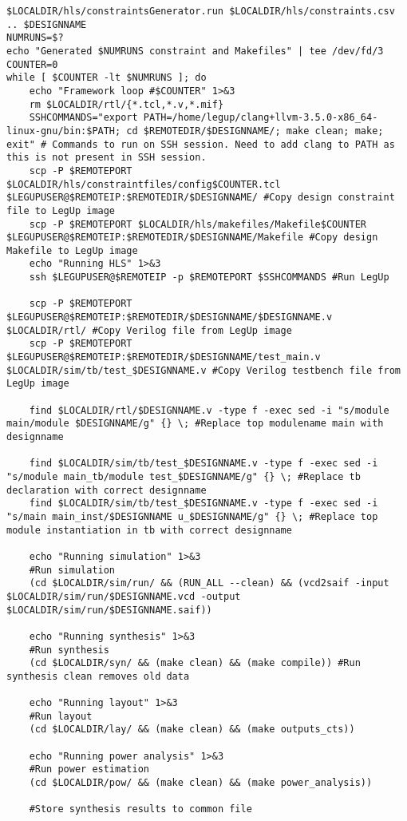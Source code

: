 \begin{lstlisting}[caption={HLS Script source code},label=lst:hlsscriptsourcecode]
$LOCALDIR/hls/constraintsGenerator.run $LOCALDIR/hls/constraints.csv .. $DESIGNNAME
NUMRUNS=$?
echo "Generated $NUMRUNS constraint and Makefiles" | tee /dev/fd/3
COUNTER=0
while [ $COUNTER -lt $NUMRUNS ]; do
	echo "Framework loop #$COUNTER" 1>&3
	rm $LOCALDIR/rtl/{*.tcl,*.v,*.mif}
	SSHCOMMANDS="export PATH=/home/legup/clang+llvm-3.5.0-x86_64-linux-gnu/bin:$PATH; cd $REMOTEDIR/$DESIGNNAME/; make clean; make; exit" # Commands to run on SSH session. Need to add clang to PATH as this is not present in SSH session.
	scp -P $REMOTEPORT $LOCALDIR/hls/constraintfiles/config$COUNTER.tcl $LEGUPUSER@$REMOTEIP:$REMOTEDIR/$DESIGNNAME/ #Copy design constraint file to LegUp image
	scp -P $REMOTEPORT $LOCALDIR/hls/makefiles/Makefile$COUNTER $LEGUPUSER@$REMOTEIP:$REMOTEDIR/$DESIGNNAME/Makefile #Copy design Makefile to LegUp image
	echo "Running HLS" 1>&3
	ssh $LEGUPUSER@$REMOTEIP -p $REMOTEPORT $SSHCOMMANDS #Run LegUp
	
	scp -P $REMOTEPORT $LEGUPUSER@$REMOTEIP:$REMOTEDIR/$DESIGNNAME/$DESIGNNAME.v $LOCALDIR/rtl/ #Copy Verilog file from LegUp image
	scp -P $REMOTEPORT $LEGUPUSER@$REMOTEIP:$REMOTEDIR/$DESIGNNAME/test_main.v $LOCALDIR/sim/tb/test_$DESIGNNAME.v #Copy Verilog testbench file from LegUp image
	
	find $LOCALDIR/rtl/$DESIGNNAME.v -type f -exec sed -i "s/module main/module $DESIGNNAME/g" {} \; #Replace top modulename main with designname
	
	find $LOCALDIR/sim/tb/test_$DESIGNNAME.v -type f -exec sed -i "s/module main_tb/module test_$DESIGNNAME/g" {} \; #Replace tb declaration with correct designname
	find $LOCALDIR/sim/tb/test_$DESIGNNAME.v -type f -exec sed -i "s/main main_inst/$DESIGNNAME u_$DESIGNNAME/g" {} \; #Replace top module instantiation in tb with correct designname
	
	echo "Running simulation" 1>&3
	#Run simulation
	(cd $LOCALDIR/sim/run/ && (RUN_ALL --clean) && (vcd2saif -input $LOCALDIR/sim/run/$DESIGNNAME.vcd -output $LOCALDIR/sim/run/$DESIGNNAME.saif)) 
	
	echo "Running synthesis" 1>&3
	#Run synthesis
	(cd $LOCALDIR/syn/ && (make clean) && (make compile)) #Run synthesis clean removes old data
	
	echo "Running layout" 1>&3
	#Run layout
	(cd $LOCALDIR/lay/ && (make clean) && (make outputs_cts))
	
	echo "Running power analysis" 1>&3
	#Run power estimation
	(cd $LOCALDIR/pow/ && (make clean) && (make power_analysis))
	
	#Store synthesis results to common file
	

\end{lstlisting}
